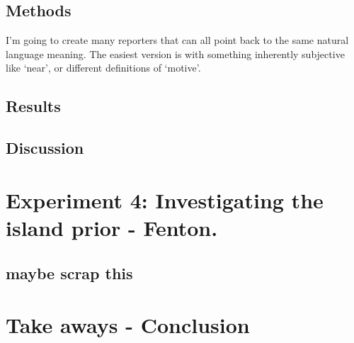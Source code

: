\subsection{Methods}
I'm going to create many reporters that can all point back to the same natural language meaning. The easiest version is with something inherently subjective like `near', or different definitions of `motive'.

\subsection{Results}

\subsection{Discussion}



\section{Experiment 4: Investigating the island prior - Fenton.}
\subsection{maybe scrap this}
\section{Take aways - Conclusion}


